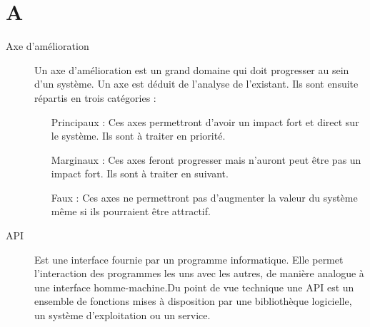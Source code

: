 \section{A}

\begin{description}

\item[Axe d'amélioration] Un axe d'amélioration est un grand domaine qui doit 
progresser au sein d'un système. Un axe est déduit de l'analyse de
 l'existant. Ils sont ensuite répartis en trois catégories : 

\begin{itemize}
\item[Principaux] : Ces axes permettront d'avoir un impact fort et direct sur le système. Ils sont à traiter en priorité.
\item[Marginaux] : Ces axes feront progresser mais n'auront peut être pas un impact fort. Ils sont à traiter en suivant.
\item[Faux] : Ces axes ne permettront pas d'augmenter la valeur du système même si ils pourraient être attractif.
\end{itemize} 

\item[API] 
Est une interface fournie par un programme informatique. Elle permet 
l'interaction des programmes les uns avec les autres, de manière analogue à 
une interface homme-machine.Du point de vue technique une API est un ensemble 
de fonctions mises à disposition par une bibliothèque logicielle, un système 
d'exploitation ou un service.


\end{description}
